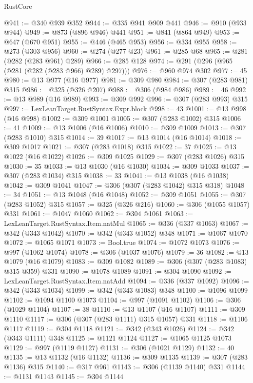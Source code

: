 \begin{lexlean}{RustCore}
\begin{coremodule}
@941 := @340 @939 @352
@944 := @335 @941 @909 @441
@946 := @910 (@933 @944)
@949 := @873 (@896 @946) @441
@951 := @841 (@864 @949)
@953 := @647 (@670 @951)
@955 := @446 (@465 @953)
@956 := @334 @955
@958 := @273 (@303 @956)
@960 := @274 (@277 @23)
@961 := @285 @68
@965 := @281 (@282 (@283 @961) @289)
@966 := @285 @128
@974 := @291 (@296 (@965 (@281 (@282 (@283 @966) @289) @297)))
@976 := @960 @974 @302
@977 := 45
@980 := @13 @977 (@16 @977)
@981 := @309 @980
@984 := @307 (@283 @981) @315
@986 := @325 (@326 @207)
@988 := @306 (@984 @986)
@989 := 46
@992 := @13 @989 (@16 @989)
@993 := @309 @992
@996 := @307 (@283 @993) @315
@997 := LexLeanTarget.RustSyntax.Expr.block
@998 := 43
@1001 := @13 @998 (@16 @998)
@1002 := @309 @1001
@1005 := @307 (@283 @1002) @315
@1006 := 41
@1009 := @13 @1006 (@16 @1006)
@1010 := @309 @1009
@1013 := @307 (@283 @1010) @315
@1014 := 39
@1017 := @13 @1014 (@16 @1014)
@1018 := @309 @1017
@1021 := @307 (@283 @1018) @315
@1022 := 37
@1025 := @13 @1022 (@16 @1022)
@1026 := @309 @1025
@1029 := @307 (@283 @1026) @315
@1030 := 35
@1033 := @13 @1030 (@16 @1030)
@1034 := @309 @1033
@1037 := @307 (@283 @1034) @315
@1038 := 33
@1041 := @13 @1038 (@16 @1038)
@1042 := @309 @1041
@1047 := @306 (@307 (@283 @1042) @315 @318)
@1048 := 34
@1051 := @13 @1048 (@16 @1048)
@1052 := @309 @1051
@1055 := @307 (@283 @1052) @315
@1057 := @325 (@326 @216)
@1060 := @306 (@1055 @1057) @331
@1061 := @1047 @1060
@1062 := @304 @1061
@1063 := LexLeanTarget.RustSyntax.Item.natMul
@1065 := @336 (@337 @1063)
@1067 := @342 (@343 @1042)
@1070 := @342 (@343 @1052) @348
@1071 := @1067 @1070
@1072 := @1065 @1071
@1073 := Bool.true
@1074 := @1072 @1073
@1076 := @997 (@1062 @1074)
@1078 := @306 (@1037 @1076)
@1079 := 36
@1082 := @13 @1079 (@16 @1079)
@1083 := @309 @1082
@1089 := @306 (@307 (@283 @1083) @315 @359) @331
@1090 := @1078 @1089
@1091 := @304 @1090
@1092 := LexLeanTarget.RustSyntax.Item.natAdd
@1094 := @336 (@337 @1092)
@1096 := @342 (@343 @1034)
@1099 := @342 (@343 @1083) @348
@1100 := @1096 @1099
@1102 := @1094 @1100 @1073
@1104 := @997 (@1091 @1102)
@1106 := @306 (@1029 @1104)
@1107 := 38
@1110 := @13 @1107 (@16 @1107)
@1111 := @309 @1110
@1117 := @306 (@307 (@283 @1111) @315 @1057) @331
@1118 := @1106 @1117
@1119 := @304 @1118
@1121 := @342 (@343 @1026)
@1124 := @342 (@343 @1111) @348
@1125 := @1121 @1124
@1127 := @1065 @1125 @1073
@1129 := @997 (@1119 @1127)
@1131 := @306 (@1021 @1129)
@1132 := 40
@1135 := @13 @1132 (@16 @1132)
@1136 := @309 @1135
@1139 := @307 (@283 @1136) @315
@1140 := @317 @961
@1143 := @306 (@1139 @1140) @331
@1144 := @1131 @1143
@1145 := @304 @1144

\end{coremodule}
\end{lexlean}

